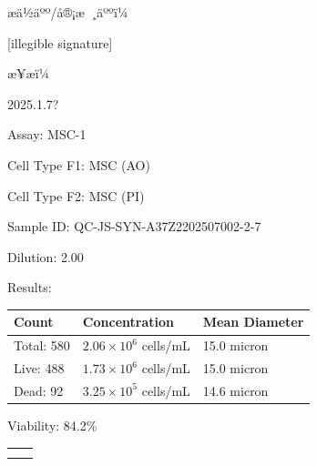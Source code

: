 \documentclass[UTF8,10pt,a4paper,fontset=fandol]{ctexart}
\newcommand{\fieldvalue}[1]{#1}
\newcommand{\handwritten}[1]{#1}
\begin{document}
\begin{center}
\begin{center}
\vfill

\noindent æä½äºº/å®¡æ ¸äººï¼

\fieldvalue{\handwritten{[illegible signature]}}

\hfill æ¥æï¼

\fieldvalue{\handwritten{2025.1.7?}}

\newpage

Assay: \fieldvalue{MSC-1}

\medskip
Cell Type F1: \fieldvalue{MSC (AO)}

Cell Type F2: \fieldvalue{MSC (PI)}

\medskip
Sample ID: \fieldvalue{QC-JS-SYN-A37Z2202507002-2-7}

Dilution: \fieldvalue{2.00}

\medskip
\noindent\hrulefill

Results:

\medskip
\begin{tabular}{lll}
\textbf{Count} & \textbf{Concentration} & \textbf{Mean Diameter} \\
\hline
Total:
\fieldvalue{580}
&
\fieldvalue{$2.06{\times}10^{6}$ cells/mL}
&
\fieldvalue{15.0 micron}
\\
Live:
\fieldvalue{488}
&
\fieldvalue{$1.73{\times}10^{6}$ cells/mL}
&
\fieldvalue{15.0 micron}
\\
Dead:
\fieldvalue{92}
&
\fieldvalue{$3.25{\times}10^{5}$ cells/mL}
&
\fieldvalue{14.6 micron}
\end{tabular}

\medskip
Viability: \fieldvalue{84.2\%}

\bigskip

\begin{center}
\begin{tabular}{cc}
\fbox{\parbox[c][0.22\textheight][c]{0.42\textwidth}{\centering
}} &
\fbox{\parbox[c][0.22\textheight][c]{0.42\textwidth}{\centering
}} \\[1em]
\fbox{\parbox[c][0.22\textheight][c]{0.22\textheight}{\centering
}} &
\fbox{\parbox[c][0.22\textheight][c]{0.42\textwidth}{\centering
}}
\end{tabular}
\end{center}


\end{center}
\end{center}
\end{document}
